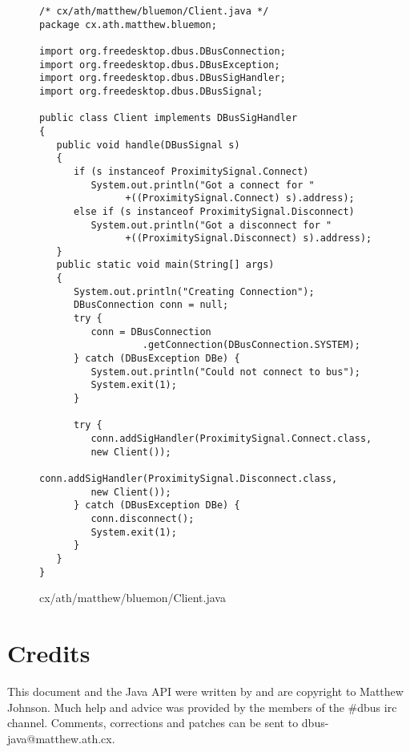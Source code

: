 \documentclass[a4paper,12pt]{article}
\begin{document}
\newpage

\begin{figure}[!h]
\begin{center}
\begin{verbatim}
/* cx/ath/matthew/bluemon/Client.java */
package cx.ath.matthew.bluemon;

import org.freedesktop.dbus.DBusConnection;
import org.freedesktop.dbus.DBusException;
import org.freedesktop.dbus.DBusSigHandler;
import org.freedesktop.dbus.DBusSignal;

public class Client implements DBusSigHandler
{
   public void handle(DBusSignal s)
   {
      if (s instanceof ProximitySignal.Connect)
         System.out.println("Got a connect for "
               +((ProximitySignal.Connect) s).address);
      else if (s instanceof ProximitySignal.Disconnect)
         System.out.println("Got a disconnect for "
               +((ProximitySignal.Disconnect) s).address);
   }
   public static void main(String[] args) 
   {
      System.out.println("Creating Connection");
      DBusConnection conn = null;
      try {
         conn = DBusConnection
                  .getConnection(DBusConnection.SYSTEM);
      } catch (DBusException DBe) {
         System.out.println("Could not connect to bus");
         System.exit(1);
      }
      
      try {
         conn.addSigHandler(ProximitySignal.Connect.class, 
         new Client());
         conn.addSigHandler(ProximitySignal.Disconnect.class, 
         new Client());
      } catch (DBusException DBe) {
         conn.disconnect();
         System.exit(1);
      }
   }
}
\end{verbatim}
\end{center}
\caption{cx/ath/matthew/bluemon/Client.java}
\end{figure}

\newpage

\section{Credits}

This document and the Java API were written by and are copyright to
Matthew Johnson. Much help and advice was provided by the members of
the \#dbus irc channel. Comments, corrections and patches can be sent
to dbus-java@matthew.ath.cx.
\end{document}
